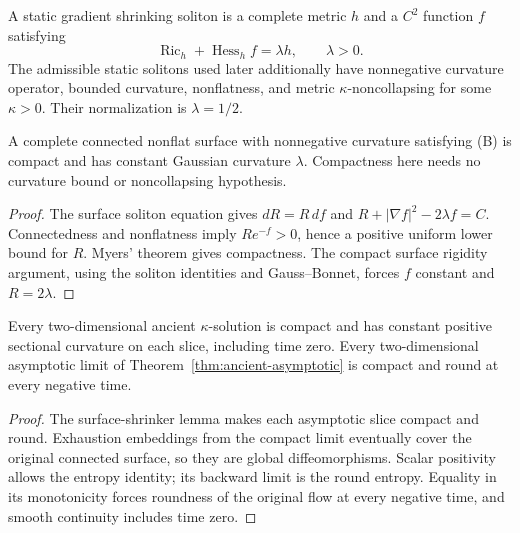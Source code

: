 A static gradient shrinking soliton is a complete metric $h$ and a
$C^2$ function $f$ satisfying
\[
       \operatorname{Ric}_h+\operatorname{Hess}_h f=\lambda h,
                         \qquad\lambda>0.                 \tag{B}
\]
The admissible static solitons used later additionally have nonnegative
curvature operator, bounded curvature, nonflatness, and metric
$\kappa$-noncollapsing for some $\kappa>0$.  Their normalization is
$\lambda=1/2$.

\begin{lemma}
\label{lem:surface-shrinker}
A complete connected nonflat surface with nonnegative curvature
satisfying (B) is compact and has constant Gaussian curvature $\lambda$.
Compactness here needs no curvature bound or noncollapsing hypothesis.
\end{lemma}
\begin{proof}
The surface soliton equation gives $dR=R\,df$ and $R+|\nabla f|^2-2\lambda
f=C$. Connectedness and nonflatness imply $Re^{-f}>0$, hence a positive
uniform lower bound for $R$. Myers' theorem gives compactness. The compact
surface rigidity argument, using the soliton identities and Gauss--Bonnet,
forces $f$ constant and $R=2\lambda$.
\end{proof}

\begin{theorem}
\label{thm:surface-ancient}
Every two-dimensional ancient $\kappa$-solution is compact and has
constant positive sectional curvature on each slice, including time
zero.  Every two-dimensional asymptotic limit of
Theorem~\ref{thm:ancient-asymptotic} is compact and round at every
negative time.
\end{theorem}
\begin{proof}
The surface-shrinker lemma makes each asymptotic slice compact and round.
Exhaustion embeddings from the compact limit eventually cover the original
connected surface, so they are global diffeomorphisms. Scalar positivity
allows the entropy identity; its backward limit is the round entropy. Equality
in its monotonicity forces roundness of the original flow at every negative
time, and smooth continuity includes time zero.
\end{proof}


